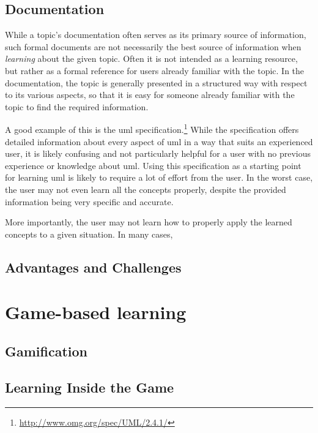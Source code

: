 \subsection{Documentation}
While a topic's documentation often serves as its primary source of information, such formal documents are not necessarily the best source of information when \emph{learning} about the given topic. Often it is not intended as a learning resource, but rather as a formal reference for users already familiar with the topic. In the documentation, the topic is generally presented in a structured way with respect to its various aspects, so that it is easy for someone already familiar with the topic to find the required information.

\noindent
A good example of this is the \gls{uml} specification.\footnote{\url{http://www.omg.org/spec/UML/2.4.1/}} While the specification offers detailed information about every aspect of \gls{uml} in a way that suits an experienced user, it is likely confusing and not particularly helpful for a user with no previous experience or knowledge about \gls{uml}. Using this specification as a starting point for learning \gls{uml} is likely to require a lot of effort from the user. In the worst case, the user may not even learn all the concepts properly, despite the provided information being very specific and accurate.

\noindent
More importantly, the user may not learn how to properly apply the learned concepts to a given situation. In many cases, 


\subsection{Advantages and Challenges}




\section{Game-based learning}
\label{sec:game_based_learning}

\subsection{Gamification}


\subsection{Learning Inside the Game}


